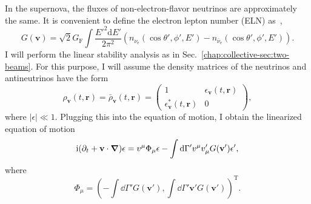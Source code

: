 In the supernova, the fluxes of non-electron-flavor neutrinos are approximately the same. It is convenient to define the electron lepton number (ELN) as~\cite{Izaguirre2016a},
\begin{equation}
G({\mathbf v}) =  \sqrt{2}G_{\mathrm F} \int \frac{E'^2 \mathrm d E'}{2\pi^2} ( n_{\nu_{\mathrm e}}(\cos\theta',\phi',E')  - n_{\bar\nu_{\mathrm e}}(\cos\theta',\phi',E')  ).
\end{equation}
I will perform the linear stability analysis as in Sec.~\ref{chap:collective-sec:two-beams}. For this purpose, I will assume the density matrices of the neutrinos and antineutrinos have the form
\begin{equation}
\rho_{\mathbf v} (t,\mathbf r)   = \bar \rho_{\mathbf v}  (t,\mathbf r)  = \begin{pmatrix}
1 & \epsilon_{\mathbf v}(t,\mathbf r) \\
\epsilon^*_{\mathbf v}(t,\mathbf r) & 0
\end{pmatrix},
\end{equation}
where $\lvert \epsilon \rvert \ll 1$. Plugging this into the equation of motion, I obtain the linearized equation of motion
\begin{equation}
    \ri ( \partial_t + \mathbf v \cdot \boldsymbol{\nabla} ) \epsilon = v^\mu \Phi_\mu \epsilon - \int \dd \Gamma' v^\mu v'_\mu G(\mathbf v') \epsilon',
    \label{chap:collective-sec:fast-mode-eqn:eom-continuous-general-linearized}
\end{equation}
where
\begin{equation}
    \Phi_\mu = \left( -\int \dd \Gamma' G(\mathbf v'), \int \dd \Gamma' \mathbf v' G(\mathbf v') \right)^{\mathrm T}.
\end{equation}
